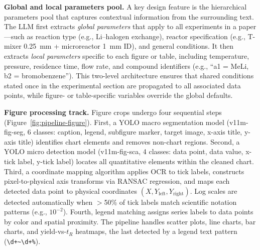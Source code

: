 \documentclass[journal=jcisd8,manuscript=article]{achemso}
\begin{document}
\textbf{Global and local parameters pool.}
A key design feature is the hierarchical parameters pool that captures contextual information from the surrounding text.
The LLM first extracts \textit{global parameters} that apply to all experiments in a paper---such as reaction type (e.g., Li--halogen exchange), reactor specification (e.g., T-mixer 0.25~mm + microreactor 1~mm ID), and general conditions.
It then extracts \textit{local parameters} specific to each figure or table, including temperature, pressure, residence time, flow rate, and compound identifiers (e.g., ``a1 = MeLi, b2 = bromobenzene'').
This two-level architecture ensures that shared conditions stated once in the experimental section are propagated to all associated data points, while figure- or table-specific variables override the global defaults.

\textbf{Figure processing track.}
Figure crops undergo four sequential steps (Figure~\ref{fig:pipeline-figure}).
First, a YOLO macro segmentation model (v11m-fig-seg, 6 classes: caption, legend, subfigure marker, target image, x-axis title, y-axis title) identifies chart elements and removes non-chart regions.
Second, a YOLO micro detection model (v11m-fig-sca, 4 classes: data point, data value, x-tick label, y-tick label) locates all quantitative elements within the cleaned chart.
Third, a coordinate mapping algorithm applies OCR to tick labels, constructs pixel-to-physical axis transforms via RANSAC regression, and maps each detected data point to physical coordinates $(X, Y_{\mathrm{left}}, Y_{\mathrm{right}})$.
Log scales are detected automatically when $>$50\% of tick labels match scientific notation patterns (e.g., $10^{-2}$).
Fourth, legend matching assigns series labels to data points by color and spatial proximity.
The pipeline handles scatter plots, line charts, bar charts, and yield-vs-$t_R$ heatmaps, the last detected by a legend text pattern (\texttt{\textbackslash d+\textasciitilde\textbackslash d+\%}).
\end{document}
